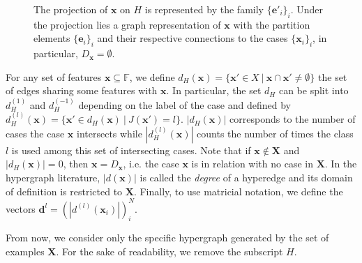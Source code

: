 \documentclass[preprint,12pt]{elsarticle}
\theoremstyle{definition}
\begin{document}
\begin{figure}[!h]
  \caption{\label{new_case_schema} The projection of $\mathbf{x}$ on $H$ is represented by the family  $\{ \mathbf e'_i\}_i$. Under the projection lies a graph representation of $\mathbf x$ with the partition elements $\{ \mathbf e_i\}_i$ and their respective connections to the cases $\{\mathbf x_i\}_i$, in particular, $D_{\mathbf x} = \emptyset$.}
\end{figure}

For any set of features $\mathbf{x} \subseteq \mathbb F$, we define $d_H(\mathbf{x}) = \{ \mathbf{x}' \in X ~ | ~ \mathbf{x} \cap \mathbf{x}' \neq \emptyset \}$ the set of edges sharing some features with $\mathbf{x}$. In particular, the set $d_H$ can be split into $d_H^{(1)}$ and $d_H^{(-1)}$ depending on the label of the case and defined by $d_H^{(l)}(\mathbf{x}) = \{\mathbf{x}' \in d_H(\mathbf{x}) ~ | ~ J(\mathbf{x}') = l \}$. $|d_H(\mathbf{x})|$ corresponds to the number of cases the case $\mathbf{x}$ intersects while $|d_H^{(l)}(\mathbf{x})|$ counts the number of times the class $l$ is used among this set of intersecting cases. Note that if $\mathbf{x} \not \in \mathbf{X}$ and $|d_H(\mathbf{x})| = 0$, then $\mathbf{x} = D_\mathbf{x}$, i.e. the case $\mathbf{x}$ is in relation with no case in $\mathbf{X}$. In the hypergraph literature, $|d(\mathbf{x})|$ is called the {\it degree} of a hyperedge and its domain of definition is restricted to $\mathbf{X}$. Finally, to use matricial notation, we define the vectors $\mathbf d^{l} = (|d^{(l)}(\mathbf x_i)|)^N_i$.

From now, we consider only the specific hypergraph generated by the set of examples $\mathbf{X}$. For the sake of readability, we remove the subscript $H$.
\end{document}
